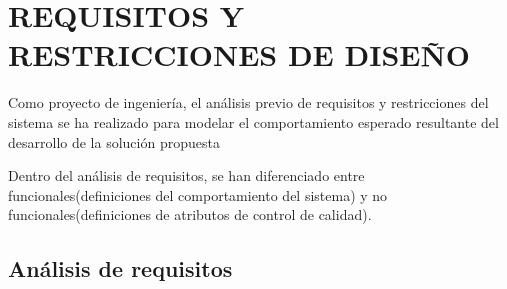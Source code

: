 \section{REQUISITOS Y RESTRICCIONES DE DISEÑO}

Como proyecto de ingeniería, el análisis previo de requisitos y restricciones del sistema se ha realizado para modelar el comportamiento esperado 
resultante del desarrollo de la solución propuesta

Dentro del análisis de requisitos, se han diferenciado entre funcionales(definiciones del comportamiento del sistema) y no funcionales(definiciones de atributos de control de calidad).

\subsection{Análisis de requisitos}
